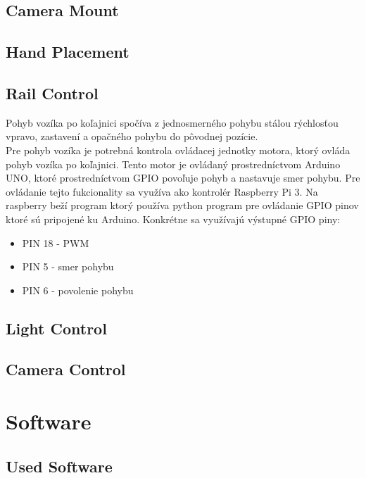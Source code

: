 \documentclass[11pt,a4paper]{article}
\begin{document}
\subsection{Camera Mount}
\subsection{Hand Placement}

\subsection{Rail Control}
Pohyb vozíka po koľajnici spočíva z jednosmerného pohybu stálou rýchlosťou vpravo, zastavení a opačného pohybu do pôvodnej pozície. \\
Pre pohyb vozíka je potrebná kontrola ovládacej jednotky motora, ktorý ovláda pohyb vozíka po koľajnici. Tento motor je ovládaný prostredníctvom Arduino UNO, ktoré prostredníctvom GPIO povoľuje pohyb a nastavuje smer pohybu. Pre ovládanie tejto fukcionality sa využíva ako kontrolér Raspberry Pi 3. Na raspberry beží program ktorý používa python program pre ovládanie GPIO pinov ktoré sú pripojené ku Arduino. Konkrétne sa využívajú výstupné GPIO piny:
\begin{itemize}
    \item PIN 18 - PWM
    \item PIN  5 - smer pohybu
    \item PIN  6 - povolenie pohybu
\end{itemize}


\subsection{Light Control}
\subsection{Camera Control}


\section{Software}
\label{sec:sw}
\subsection{Used Software}
\end{document}
